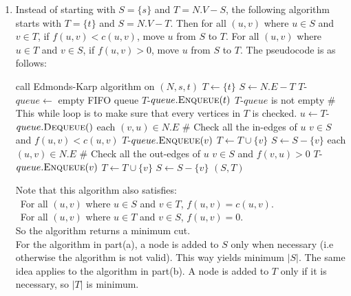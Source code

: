 \documentclass[11pt]{article}
\begin{document}
\begin{enumerate}[label=(\alph*)]
\item
Instead of starting with $S = \{s\}$ and $T = N.V - S$, the following algorithm starts with $T = \{t\}$ and $S = N.V - T$. Then for all $(u, v)$ where $u \in S$ and $v \in T$, if $f(u, v) < c(u, v)$, move $u$ from $S$ to $T$. For all $(u, v)$ where $u \in T$ and $v \in S$, if $f(u, v) > 0$, move $u$ from $S$ to $T$. The pseudocode is as follows:
\begin{codebox}
\li call Edmonds-Karp algorithm on $(N, s, t)$
\li $T \gets \{t\}$
\li $S \gets N.E - T$
\li $T$-$queue \gets$ empty FIFO queue
\li $T$-$queue.\textnormal{\scshape Enqueue}(t)$
\li \While $T$-$queue$ is not empty \# This while loop is to make sure that every vertices in $T$ is checked.
\li      \Then $u \gets T$-$queue.\textnormal{\scshape Dequeue}()$
\li            \For each $(v, u) \in N.E$  \# Check all the in-edges of $u$
\li                          \Then \If $v \in S$ and $f(u, v) < c(u, v)$
\li                                  \Then $T$-$queue.\textnormal{\scshape Enqueue}(v)$
\li                                         $T\gets T \cup \{v\}$
\li                                         $S\gets S - \{v\}$\End\End
\li             \For each $(u, v) \in N.E$ \# Check all the out-edges of $u$
\li                    \Then \If $v \in S$ and $f(v, u) > 0$
\li                             \Then $T$-$queue.\textnormal{\scshape Enqueue}(v)$
\li                                   $T\gets T \cup \{v\}$
\li                                         $S\gets S- \{v\}$\End\End\End
\li \Return $(S, T)$
\end{codebox}
Note that this algorithm also satisfies:\\
\textbullet ~For all $(u, v)$ where $u \in S$ and $v \in T$, $f(u, v)=c(u, v)$.\\
\textbullet ~For all $(u, v)$ where $u \in T$ and $v \in S$, $f(u, v)=0$.\\
So the algorithm returns a minimum cut.\\
For the algorithm in part(a), a node is added to $S$ only when necessary (i.e otherwise the algorithm is not valid). This way yields minimum $|S|$. The same idea applies to the algorithm in part(b). A node is added to $T$ only if it is necessary, so $|T|$ is minimum.


\end{enumerate}
\end{document}
